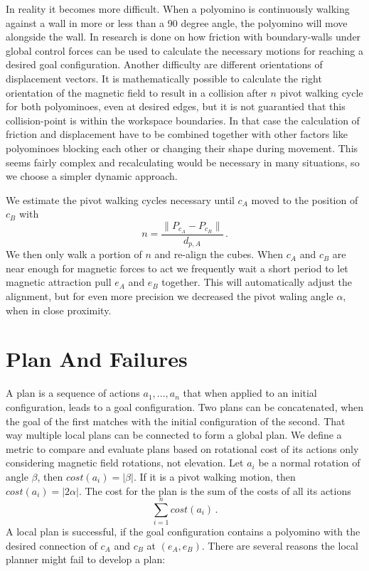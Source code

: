 In reality it becomes more difficult.
When a polyomino is continuously walking against a wall in more or less than a 90 degree angle, the polyomino will move alongside the wall. In \cite{schmidt2020} research is done on how friction with boundary-walls under global control forces can be used to calculate the necessary motions for reaching a desired goal configuration.
Another difficulty are different orientations of displacement vectors.
It is mathematically possible to calculate the right orientation of the magnetic field to result in a collision after $n$ pivot walking cycle for both polyominoes, even at desired edges, but it is not guarantied that this collision-point is within the workspace boundaries.
In that case the calculation of friction and displacement have to be combined together with other factors like polyominoes blocking each other or changing their shape during movement.
This seems fairly complex and recalculating would be necessary in many situations, so we choose a simpler dynamic approach.

We estimate the pivot walking cycles necessary until $c_A$ moved to the position of $c_B$ with
\begin{equation*}
n = \frac{\lVert P_{c_A} - P_{c_B}\rVert}{d_{p,A}} \,.
\end{equation*}
We then only walk a portion of $n$ and re-align the cubes.
When $c_A$ and $c_B$ are near enough for magnetic forces to act we frequently wait a short period to let magnetic attraction pull $e_A$ and $e_B$ together.
This will automatically adjust the alignment, but for even more precision we decreased the pivot waling angle $\alpha$, when in close proximity.

\section{Plan And Failures}
\label{sec:plan}

A plan is a sequence of actions $a_1, ... , a_n$ that when applied to an initial configuration, leads to a goal configuration.
Two plans can be concatenated, when the goal of the first matches with the initial configuration of the second.
That way multiple local plans can be connected to form a global plan.
We define a metric to compare and evaluate plans based on rotational cost of its actions only considering magnetic field rotations, not elevation.
Let $a_i$ be a normal rotation of angle $\beta$, then $cost(a_i) = |\beta|$.
If it is a pivot walking motion, then $cost(a_i) = |2\alpha|$.
The cost for the plan is the sum of the costs of all its actions
\begin{equation*}
\sum_{i=1}^{n} cost(a_i) \,.
\end{equation*}
A local plan is successful, if the goal configuration contains a polyomino with the desired connection of $c_A$ and $c_B$ at $(e_A, e_B)$.
There are several reasons the local planner might fail to develop a plan:

